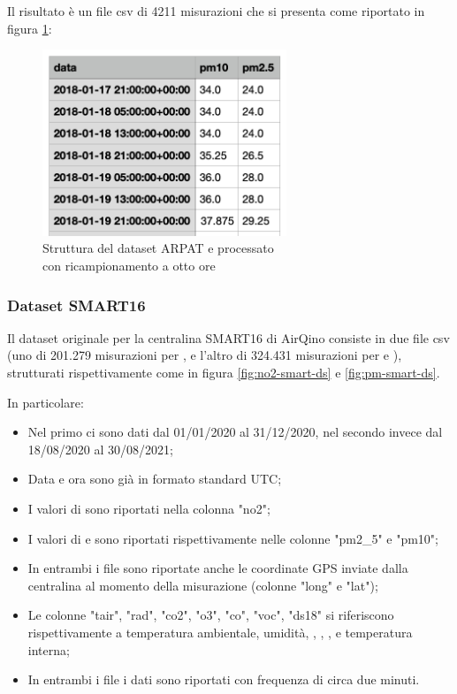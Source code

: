 Il risultato è un file csv di 4211 misurazioni che si presenta come riportato in figura \ref{fig:ds-arpat-pm-dopo}:

\begin{figure}[H]
\centering
\captionsetup{justification=centering}
\includegraphics[width=0.65\textwidth,height=\textheight,keepaspectratio]{img/dataset_arpat_pm_dopo.png}
\caption{Struttura del dataset ARPAT  e  processato\\con ricampionamento a otto ore}
\label{fig:ds-arpat-pm-dopo}
\end{figure}


\subsubsection{Dataset SMART16}
Il dataset originale per la centralina SMART16 di AirQino consiste in due file csv (uno di 201.279 misurazioni per , e l'altro di 324.431 misurazioni per  e ), strutturati rispettivamente come in figura \ref{fig:no2-smart-ds} e \ref{fig:pm-smart-ds}. 


In particolare:

\begin{itemize}
  \item Nel primo ci sono dati dal 01/01/2020 al 31/12/2020, nel secondo invece dal 18/08/2020 al 30/08/2021;
  \item Data e ora sono già in formato standard UTC;
  \item I valori di  sono riportati nella colonna "no2";
  \item I valori di  e  sono riportati rispettivamente nelle colonne "pm2\_5" e "pm10";
  \item In entrambi i file sono riportate anche le coordinate GPS inviate dalla centralina al momento della misurazione (colonne "long" e "lat");
  \item Le colonne "tair", "rad", "co2", "o3", "co", "voc", "ds18" si riferiscono rispettivamente a temperatura ambientale, umidità, , , ,  e temperatura interna;
  \item In entrambi i file i dati sono riportati con frequenza di circa due minuti.
\end{itemize}

